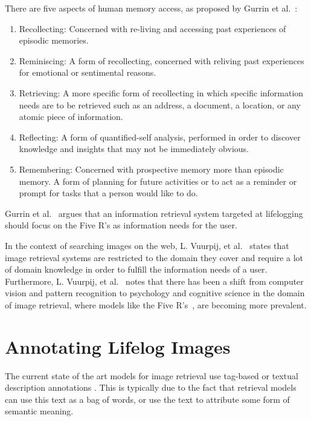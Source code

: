 \documentclass[12pt,a4paper]{article}
\begin{document}
There are five aspects of human memory access, as proposed by Gurrin et al.~\cite{gurrin2014lifelogging}:
\begin{enumerate}
    \item Recollecting: Concerned with re-living and accessing past experiences of episodic memories.
    \item Reminiscing: A form of recollecting, concerned with reliving past experiences for emotional or sentimental reasons.
    \item Retrieving: A more specific form of recollecting  in which specific information needs are to be retrieved such as an address, a document, a location, or any atomic piece of information.
    \item Reflecting: A form of quantified-self analysis, performed in order to discover knowledge and insights that may not be immediately obvious.
    \item Remembering: Concerned with prospective memory more than episodic memory. A form of planning for future activities or to act as a reminder or prompt for tasks that a person would like to do.
\end{enumerate}
Gurrin et al.~\cite{gurrin2014lifelogging} argues that an information retrieval system targeted at lifelogging should focus on the Five R's as information needs for the user.

In the context of searching images on the web,  L. Vuurpij, et al.~\cite{vuurpij2002vind} states that image retrieval systems are restricted to the domain they cover and require a lot of domain knowledge in order to fulfill the information needs of a user. Furthermore, L. Vuurpij, et al.~\cite{vuurpij2002vind} notes that there has been a shift from computer vision and pattern recognition to psychology and cognitive science in the domain of image retrieval, where models like the Five R's~\cite{gurrin2014lifelogging}, are becoming more prevalent. 

\section{Annotating Lifelog Images}
The current state of the art models for image retrieval use tag-based or textual description annotations \citep{ali2010semantically}. This is typically due to the fact that retrieval models can use this text as a bag of words, or use the text to attribute some form of semantic meaning.
\end{document}
